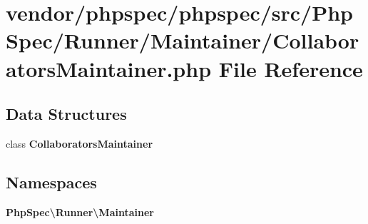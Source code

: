 \section{vendor/phpspec/phpspec/src/\+Php\+Spec/\+Runner/\+Maintainer/\+Collaborators\+Maintainer.php File Reference}
\label{_collaborators_maintainer_8php}
\subsection*{Data Structures}
\begin{DoxyCompactItemize}
\item 
class {\bf Collaborators\+Maintainer}
\end{DoxyCompactItemize}
\subsection*{Namespaces}
\begin{DoxyCompactItemize}
\item 
 {\bf Php\+Spec\textbackslash{}\+Runner\textbackslash{}\+Maintainer}
\end{DoxyCompactItemize}
